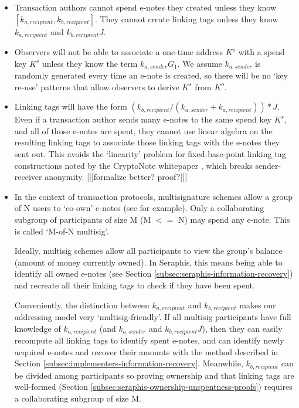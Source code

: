 \begin{itemize}
    \item Transaction authors cannot spend e-notes they created unless they know $[k_{a, recipient}, k_{b, recipient}]$. They cannot create linking tags unless they know $k_{a, recipient}$ and $k_{b, recipient} J$.

    \item Observers will not be able to associate a one-time address $K^o$ with a spend key $K^s$ unless they know the term $k_{a,sender} G_1$. We assume $k_{a,sender}$ is randomly generated every time an e-note is created, so there will be no `key re-use' patterns that allow observers to derive $K^s$ from $K^o$.

    \item Linking tags will have the form $(k_{b, recipient}/(k_{a, sender} + k_{a, recipient}))*J$. Even if a transaction author sends many e-notes to the same spend key $K^s$, and all of those e-notes are spent, they cannot use linear algebra on the resulting linking tags to associate those linking tags with the e-notes they sent out. This avoids the `linearity' problem for fixed-base-point linking tag constructions noted by the CryptoNote whitepaper \cite{cryptoNoteWhitePaper}, which breaks sender-receiver anonymity. [[[formalize better? proof?]]]

    \item In the context of transaction protocols, multisignature schemes allow a group of N users to `co-own' e-notes (see \cite{MRL-0009-multisig} for example). Only a collaborating subgroup of participants of size M (M $<=$ N) may spend any e-note. This is called `M-of-N multisig'.

    Ideally, multisig schemes allow all participants to view the group's balance (amount of money currently owned). In Seraphis, this means being able to identify all owned e-notes (see Section \ref{subsec:seraphis-information-recovery}) and recreate all their linking tags to check if they have been spent.

    Conveniently, the distinction between $k_{a, recipient}$ and $k_{b, recipient}$ makes our addressing model very `multisig-friendly'. If all multisig participants have full knowledge of $k_{a, recipient}$ (and $k_{a,sender}$ and $k_{b, recipient} J$), then they can easily recompute all linking tags to identify spent e-notes, and can identify newly acquired e-notes and recover their amounts with the method described in Section \ref{subsec:implementers-information-recovery}. Meanwhile, $k_{b, recipient}$ can be divided among participants so proving ownership and that linking tags are well-formed (Section \ref{subsec:seraphis-ownership-unspentness-proofs}) requires a collaborating subgroup of size M.


\end{itemize}
